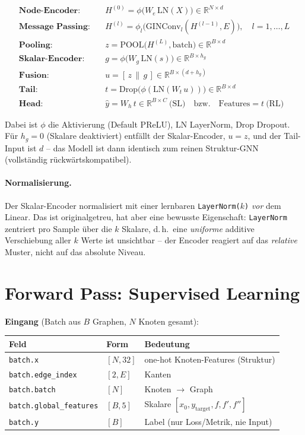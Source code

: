 \documentclass[11pt,a4paper]{article}
\newcommand{\code}[1]{\texttt{#1}}
\begin{document}
\begin{align}
\textbf{Node-Encoder:}\quad & H^{(0)} = \phi\!\big(W_e\,\mathrm{LN}(X)\big) \in \mathbb{R}^{N\times d}\\
\textbf{Message Passing:}\quad & H^{(l)} = \phi_l\!\big(\mathrm{GINConv}_l(H^{(l-1)}, E)\big),\quad l=1,\dots,L\\
\textbf{Pooling:}\quad & z = \mathrm{POOL}\big(H^{(L)}, \text{batch}\big) \in \mathbb{R}^{B\times d}\\
\textbf{Skalar-Encoder:}\quad & g = \phi\!\big(W_g\,\mathrm{LN}(s)\big) \in \mathbb{R}^{B\times h_g}\\
\textbf{Fusion:}\quad & u = [\,z \,\|\, g\,] \in \mathbb{R}^{B\times(d+h_g)}\\
\textbf{Tail:}\quad & t = \mathrm{Drop}\big(\phi(\mathrm{LN}(W_t\,u))\big) \in \mathbb{R}^{B\times d}\\
\textbf{Head:}\quad & \hat{y} = W_h\,t \in \mathbb{R}^{B\times C}\ \text{(SL)} \quad\text{bzw.}\quad \text{Features} = t\ \text{(RL)}
\end{align}

Dabei ist $\phi$ die Aktivierung (Default PReLU), $\mathrm{LN}$ LayerNorm,
$\mathrm{Drop}$ Dropout. Für $h_g{=}0$ (Skalare deaktiviert) entfällt der
Skalar-Encoder, $u=z$, und der Tail-Input ist $d$ -- das Modell ist dann
identisch zum reinen Struktur-GNN (vollständig rückwärtskompatibel).

\paragraph{Normalisierung.} Der Skalar-Encoder normalisiert mit einer lernbaren
\code{LayerNorm($k$)} \emph{vor} dem Linear. Das ist originalgetreu, hat aber eine
bewusste Eigenschaft: \code{LayerNorm} zentriert pro Sample über die $k$ Skalare,
d.\,h.\ eine \emph{uniforme} additive Verschiebung aller $k$ Werte ist unsichtbar --
der Encoder reagiert auf das \emph{relative} Muster, nicht auf das absolute Niveau.

\section{Forward Pass: Supervised Learning}

\textbf{Eingang} (Batch aus $B$ Graphen, $N$ Knoten gesamt):

\begin{center}\small
\begin{tabular}{@{}lll@{}}
\toprule
Feld & Form & Bedeutung \\
\midrule
\code{batch.x} & $[N, 32]$ & one-hot Knoten-Features (Struktur) \\
\code{batch.edge\_index} & $[2, E]$ & Kanten \\
\code{batch.batch} & $[N]$ & Knoten $\rightarrow$ Graph \\
\code{batch.global\_features} & $[B, 5]$ & Skalare $[x_0, y_{\text{target}}, f, f', f'']$ \\
\code{batch.y} & $[B]$ & Label (nur Loss/Metrik, nie Input) \\
\bottomrule
\end{tabular}
\end{center}
\end{document}
